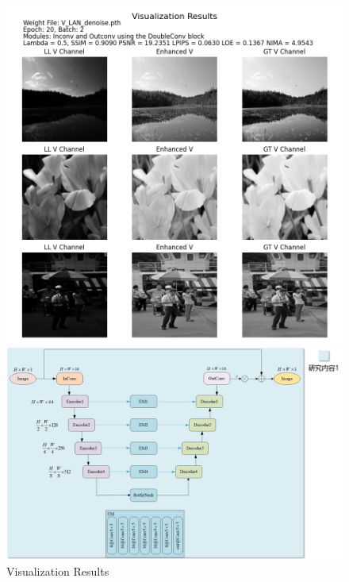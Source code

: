 \documentclass[CJK,aspectratio=169]{beamer}  %
\begin{document}
	\begin{frame}
		\begin{figure}
			\centering			
			\begin{minipage}{.4\columnwidth}
				\setlength{\abovecaptionskip}{0.2cm}
				\centering
				\includegraphics[width=\textwidth]{picture/LLIE/Experiment/myplot_V_LAN_denoise}
				\caption*{\tiny Visualization Results}
			\end{minipage}
			\begin{minipage}{.58\columnwidth}
				\setlength{\abovecaptionskip}{-0.05cm}
				\centering
				\includegraphics[width=\textwidth]{picture/LLIE/My Architecture/Baseline}
			\end{minipage}
		\end{figure}

	\end{frame}
	
\end{document}
